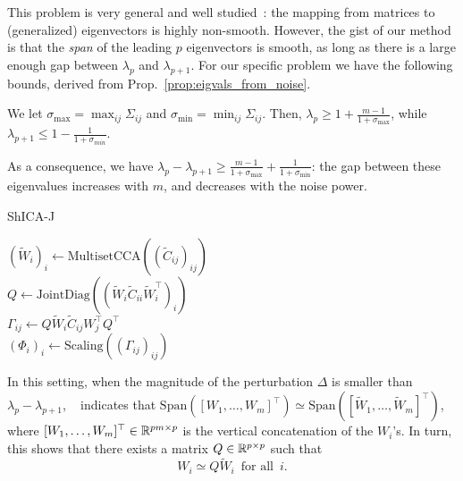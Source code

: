 This problem is very general and well studied~\cite{stewart1973error}: the mapping from matrices to (generalized) eigenvectors is highly non-smooth.
%
However, the gist of our method is that the \emph{span} of the leading $p$ eigenvectors is smooth, as long as there is a large enough gap between  $\lambda_p$ and $\lambda_{p+1}$.
For our specific problem we have the following bounds, derived from Prop.~\ref{prop:eigvals_from_noise}.
\begin{proposition}
  We let $\sigma_{\max} = \max_{ij}\Sigma_{ij}$ and $\sigma_{\min} = \min_{ij}\Sigma_{ij}$. Then, $\lambda_p \geq 1 + \frac{m-1}{1+\sigma_{\max}}$, while $\lambda_{p+1}\leq 1 - \frac{1}{1 + \sigma_{min}}$.
\end{proposition}
As a consequence, we have $\lambda_{p} -\lambda_{p+1} \geq \frac{m-1}{1+\sigma_{\max}} + \frac{1}{1+ \sigma_{\min}}$: the gap between these eigenvalues increases with $m$, and decreases with the noise power.

  \begin{algorithm}[H]
    \SetAlgoLined
  \caption{ShICA-J}
  \label{algo:shicaj}
    $(\tilde{W}_i)_i \leftarrow \mathrm{MultisetCCA}((\tilde{C}_{ij})_{ij})$ \\
        $Q \leftarrow
        \mathrm{JointDiag}((\tilde{W}_i\tilde{C}_{ii}\tilde{W}_i^{\top})_i)$ \\
       $\Gamma_{ij} \leftarrow Q\tilde{W}_i\tilde{C}_{ij}W_j^\top Q^\top$ \\
       $(\Phi_i)_i \leftarrow \mathrm{Scaling}((\Gamma_{ij})_{ij})$ \\
  \end{algorithm}

In this setting, when the magnitude of the perturbation $\Delta$ is smaller than $\lambda_{p}-\lambda_{p+1}$, ~\cite{stewart1973error} indicates that $\mathrm{Span}([W_1, \dots, W_m]^{\top})\simeq \mathrm{Span}([\tilde{W}_1,\dots, \tilde{W}_m]^\top)$, where $[W_1, \dots, W_m]^{\top}\in\mathbb{R}^{pm\times p}$ is the vertical concatenation of the $W_i$'s.
In turn, this shows that there exists a matrix $Q\in\mathbb{R}^{p\times p}$ such that
%
%
\begin{equation}
    \label{eq:justif_jd}
    W_i \simeq Q\tilde{W}_i\enspace \text{for all} \enspace i.
\end{equation}

